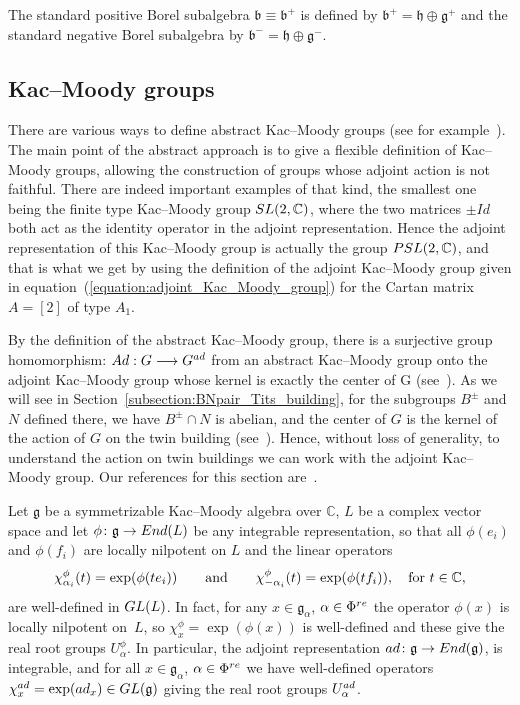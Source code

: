 \documentclass[11pt]{article}
\numberwithin{equation}{section}
\numberwithin{equation}{section}
\def\C{{\mathbb C}}
\def\a{\alpha}
\def\roots{{\Phi}}
\def\g{\mathfrak{g}}
\def\b{\mathfrak{b}}
\def\fg{\mathfrak{g}}
\def\h{\mathfrak{h}}
\begin{document}
The standard positive Borel subalgebra $\b\equiv\b^+$ is defined by $\b^+=\h\oplus \g^+$ and the standard negative Borel subalgebra by $\b^-=\h\oplus \g^-$.

\subsection{Kac--Moody groups}

There are various ways to define abstract Kac--Moody groups
(see for example~\cite{KacPeterson85c, Marquis18, Remy02,Tits87}).
The main point of the abstract approach is to give a flexible definition of Kac--Moody groups, allowing the construction of groups whose adjoint action is not faithful. There are indeed important examples of that kind, the smallest one being the finite type Kac--Moody group ${\rm SL}(2, \C)$, where the two matrices $\pm Id$ both act as the identity operator in the adjoint representation. Hence the adjoint representation of this Kac--Moody group is actually the group ${\rm PSL}(2, \C)$, and that is what we get by using the definition of the adjoint Kac--Moody group given in equation~(\ref{equation:adjoint_Kac_Moody_group}) for the Cartan matrix $A = [2]$ of type $A_1$.

By the definition of the abstract Kac--Moody group, there is a surjective group homomorphism: $Ad: G\longrightarrow G^{\rm ad}$ from an abstract Kac--Moody group onto the adjoint Kac--Moody group whose kernel is exactly the center of G (see~\cite[Proposition~9.6.2]{Remy02}). As we will see in Section~\ref{subsection:BNpair_Tits_building}, for the subgroups $B^\pm$ and $N$ defined there, we have
$B^\pm\cap N$ is abelian, and the center of $G$ is the kernel of the action of $G$ on the twin building (see~\cite[Lemma~1.7]{Caprace09}). Hence, without loss of generality, to understand the action on twin buildings we can work with the adjoint Kac--Moody group.
Our references for this section are~\cite{ KacPeterson85c,Kumar02, Marquis18, Moody95}.

Let $\g$ be a symmetrizable Kac--Moody algebra over $\C$, $L$ be a complex vector space and let
$\phi\colon \fg\to {\rm End}(L)$ be any integrable representation, so that
all $\phi(e_i)$ and $\phi(f_i)$ are locally nilpotent on $L$ and the linear operators
\[\chi^\phi_{{\a}_i}(t) = \exp(\phi(te_i))\qquad\hbox{and}\qquad \chi^\phi_{{-\a}_i}(t) = \exp(\phi(tf_i)),\quad \text{for} \ t\in\C,\]
are well-defined in ${\rm GL}(L)$. In fact, for any $x\in \g_{\a}$, $\a\in\roots^{\rm re}$ the operator $\phi(x)$ is locally nilpotent on~$L$, so
$\chi^\phi_x = \exp(\phi(x))$ is well-defined and these give the real root groups $U_\a^\phi$. In particular, the adjoint representation
${\rm ad}\colon \fg \to {\rm End}(\g)$, is integrable, and for all $x\in \g_{\a}$, $\a\in\roots^{\rm re}$ we have well-defined operators $\chi^{\rm ad}_x = \exp({\rm ad}_x)\in {\rm GL}(\g)$ giving the real root groups $U_\a^{\rm ad}$.
\end{document}
